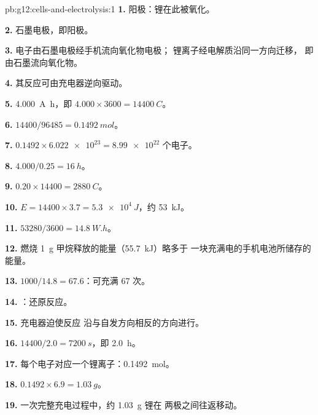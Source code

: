 \begin{solution}{pb:g12:cells-and-electrolysis:1}
\textbf{1.} 阳极：锂在此被氧化。

\textbf{2.} 石墨电极，即阳极。

\textbf{3.} 电子由石墨电极经手机流向氧化物电极；
锂离子经电解质沿同一方向迁移，
即由石墨流向氧化物。

\textbf{4.} 其反应可由充电器逆向驱动。

\textbf{5.} \qty{4.000}{A.h}，即 $4.000 \times 3600 =
\qty{14400}{C}$。

\textbf{6.} $14400/96485 = \qty{0.1492}{mol}$。

\textbf{7.} $0.1492 \times \num{6.022e23} = \num{8.99e22}$ 个电子。

\textbf{8.} $4.000/0.25 = \qty{16}{h}$。

\textbf{9.} $0.20 \times 14400 = \qty{2880}{C}$。

\textbf{10.} $E = 14400 \times 3.7 = \qty{5.3e4}{J}$，约 \qty{53}{kJ}。

\textbf{11.} $53280/3600 = \qty{14.8}{W.h}$。

\textbf{12.} 燃烧 \qty{1}{g} 甲烷释放的能量（\qty{55.7}{kJ}）略多于
一块充满电的手机电池所储存的能量。

\textbf{13.} $1000/14.8 = 67.6$：可充满 67 次。

\textbf{14.} ：还原反应。

\textbf{15.} 充电器迫使反应
沿与自发方向相反的方向进行。

\textbf{16.} $14400/2.0 = \qty{7200}{s}$，即 \qty{2.0}{h}。

\textbf{17.} 每个电子对应一个锂离子：\qty{0.1492}{mol}。

\textbf{18.} $0.1492 \times 6.9 = \qty{1.03}{g}$。

\textbf{19.} 一次完整充电过程中，约 \qty{1.03}{g} 锂在
两极之间往返移动。
\end{solution}
